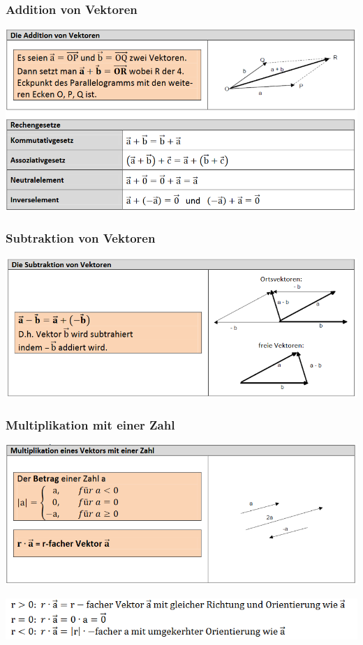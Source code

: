 \subsubsection{Addition von Vektoren}
\includegraphics[scale=0.7]{vec1.PNG}
\subsubsection{Subtraktion von Vektoren}
\includegraphics[scale=0.7]{vec2.PNG}
\subsubsection{Multiplikation mit einer Zahl}
\includegraphics[scale=0.7]{vec3.PNG}

\includegraphics[scale=0.7]{vec3-1.PNG}

